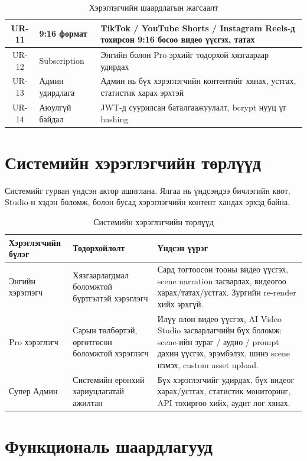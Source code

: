 \begin{table}[H]
\begin{tabular}{|c|p{3.5cm}|p{8.5cm}|}
\hline
UR-11 & 9:16 формат & TikTok / YouTube Shorts / Instagram Reels-д тохирсон 9:16 босоо видео үүсгэх, татах \\
\hline
UR-12 & Subscription & Энгийн болон Pro эрхийг тодорхой хязгаараар удирдах \\
\hline
UR-13 & Админ удирдлага & Админ нь бүх хэрэглэгчийн контентийг хянах, устгах, статистик харах эрхтэй \\
\hline
UR-14 & Аюулгүй байдал & JWT-д суурилсан баталгаажуулалт, bcrypt нууц үг hashing \\
\hline
\end{tabular}
\caption{Хэрэглэгчийн шаардлагын жагсаалт}
\end{table}

\section{Системийн хэрэглэгчийн төрлүүд}

Системийг гурван үндсэн актор ашиглана. Ялгаа нь үндсэндээ бичлэгийн квот, Studio-н хэдэн боломж, болон бусад хэрэглэгчийн контент хандах эрхэд байна.

\begin{table}[H]
\centering
\label{tab:user_types}
\small
\begin{tabular}{|p{2.8cm}|p{4cm}|p{6cm}|}
\hline
\textbf{Хэрэглэгчийн бүлэг} & \textbf{Тодорхойлолт} & \textbf{Үндсэн үүрэг} \\
\hline
Энгийн хэрэглэгч & Хязгаарлагдмал боломжтой бүртгэлтэй хэрэглэгч & Сард тогтоосон тооны видео үүсгэх, scene narration засварлах, видеогоо харах/татах/устгах. Зургийн re-render хийх эрхгүй. \\
\hline
Pro хэрэглэгч & Сарын төлбөртэй, өргөтгөсөн боломжтой хэрэглэгч & Илүү олон видео үүсгэх, AI Video Studio засварлагчийн бүх боломж: scene-ийн зураг / аудио / prompt дахин үүсгэх, эрэмбэлэх, шинэ scene нэмэх, custom asset upload. \\
\hline
Супер Админ & Системийн ерөнхий хариуцлагатай ажилтан & Бүх хэрэглэгчийг удирдах, бүх видеог харах/устгах, статистик мониторинг, API тохиргоо хийх, аудит лог хянах. \\
\hline
\end{tabular}
\caption{Системийн хэрэглэгчийн төрлүүд}
\end{table}

\section{Функциональ шаардлагууд}

